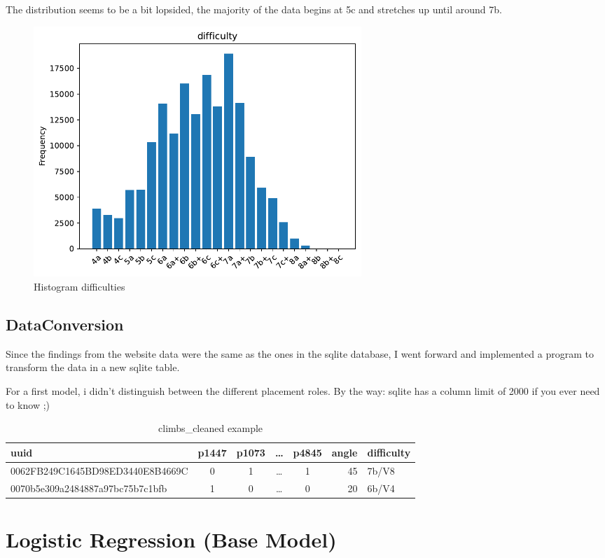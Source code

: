 \documentclass{article}
\begin{document}
The distribution seems to be a bit lopsided, the majority of the data begins at 5c and stretches up until around 7b.
\begin{figure}[H]
    \centering    
    \includegraphics[width=0.6\textwidth]{../DataAnalysis/histogram_difficulties.pdf}
    \caption{Histogram difficulties}\label{fig:histogram_difficulties}
\end{figure}

\subsection{DataConversion}

Since the findings from the website data were the same as the ones in the sqlite database, 
I went forward and implemented a program to transform the data in a new sqlite table.

For a first model, i didn't distinguish between the different placement roles. By the way: sqlite has a column limit of 2000 if you ever need to know ;)

 
\begin{table}[ht]
    \begin{center}
    \begin{tabular}{@{}l c c c c r l@{}} 
       \toprule
       uuid & p1447 & p1073 & \ldots & p4845 & angle & difficulty \\
       \midrule
       0062FB249C1645BD98ED3440E8B4669C & 0 & 1 & \ldots & 1 & 45 & 7b/V8 \\
       0070b5e309a2484887a97bc75b7c1bfb & 1 & 0 & \ldots & 0 & 20 & 6b/V4 \\
       \bottomrule
    \end{tabular}
    \end{center}
    \caption{climbs\_cleaned example}\label{tab:climbs_cleaned}
\end{table}

\FloatBarrier\section{Logistic Regression (Base Model)}
\end{document}
